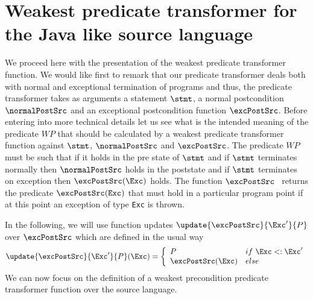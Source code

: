 


\section{Weakest predicate transformer for the Java like source language } \label{pog:wpSrcGeneral}
We proceed here with the presentation of the weakest predicate transformer function. We would like first to remark
that our predicate transformer deals both with normal and exceptional termination of programs and thus, the predicate transformer
takes as arguments a statement  $\stmt$, a normal postcondition 
$\normalPostSrc$ and an exceptional postcondition function  $\excPostSrc$.
Before entering into more technical details let us see what is the intended meaning of the predicate $WP$ that 
should be calculated by a weakest predicate transformer function against  $\stmt$,
$\normalPostSrc$ and  $\excPostSrc$. The predicate    $WP$ must be 
 such that if it holds in the pre state of $\stmt$ and   if $\stmt$ terminates normally then $\normalPostSrc$  holds in the poststate and
 if $\stmt$ terminates on exception \Exc{} then $\excPostSrc(\Exc)$ holds. 
The function $\excPostSrc$ \ returns the predicate $\excPostSrc (\mbox{\rm\texttt{Exc}}) $ that must hold in a particular program point if
 at this point an exception of type \mbox{\rm\texttt{Exc}} is thrown.

In the following, we will use function updates $\update{\excPostSrc}{\Exc'}{ P } $ over $\excPostSrc $ which are defined in the usual way
$$
\update{\excPostSrc}{\Exc'}{ P }( \Exc )  = 
       \left\{\begin{array}{ll} 
         P & if \ \Exc  <: \Exc'  \\
         \excPostSrc(\Exc ) & else 
     \end{array}\right.$$
We can now  focus on the definition of a weakest precondition predicate transformer function over the source language.
